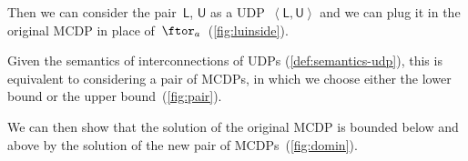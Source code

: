 \noindent Then we can consider the pair~$\boldsymbol{\mathsf{L}}$,
$\boldsymbol{\mathsf{U}}$ as a UDP~$\left\langle \boldsymbol{\mathsf{L}},\boldsymbol{\mathsf{U}}\right\rangle $
and we can plug it in the original MCDP in place of~$\ftor_{a}$~(\cref{fig:luinside}).
\begin{center}
  \par
\end{center}

\noindent Given the semantics of interconnections of UDPs (\cref{def:semantics-udp}),
this is equivalent to considering a pair of MCDPs, in which we choose
either the lower bound or the upper bound~(\cref{fig:pair}).
\begin{center}
  \par
\end{center}

\noindent We can then show that the solution of the original MCDP
is bounded below and above by the solution of the new pair of MCDPs~(\cref{fig:domin}).
\begin{center}
  \par
\end{center}

